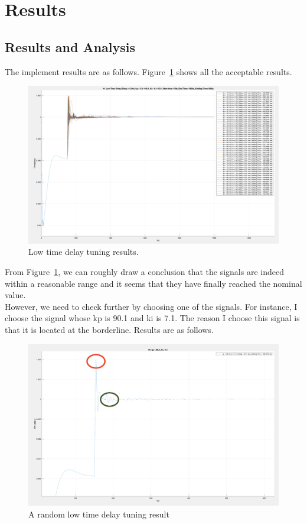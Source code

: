 \section{Results} %
\label{section4.4}
\subsection{Results and Analysis} %
The implement results are as follows. Figure~\ref{4_4_1_result1} shows all the acceptable results.

\begin{figure}[htbp]
\centering
\includegraphics[width = .819\textwidth]{figure/4_4_1_result1.png}
\caption{Low time delay tuning results.}
\label{4_4_1_result1}
\end{figure}

From Figure~\ref{4_4_1_result1}, we can roughly draw a conclusion that the signals are indeed within a reasonable range and it seems that they have finally reached the nominal value.\\

However, we need to check further by choosing one of the signals. For instance, I choose the signal whose kp is 90.1 and ki is 7.1. The reason I choose this signal is that it is located at the borderline. Results are as follows.\\

\begin{figure}[htbp]
\centering
\includegraphics[width = .819\textwidth]{figure/4_4_1_result2.png}
\caption{A random low time delay tuning result}
\label{4_4_1_result2}
\end{figure}

